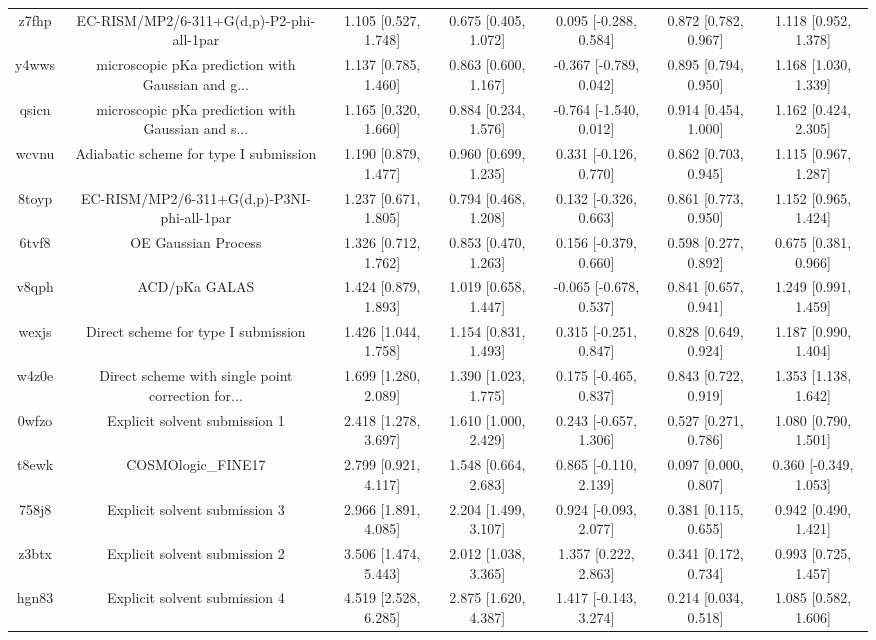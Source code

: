 \documentclass{article}
\begin{document}
\begin{center}
\begin{longtable}{|ccccccc|}
 z7fhp &           EC-RISM/MP2/6-311+G(d,p)-P2-phi-all-1par &  1.105 [0.527, 1.748] &  0.675 [0.405, 1.072] &    0.095 [-0.288, 0.584] &  0.872 [0.782, 0.967] &   1.118 [0.952, 1.378] \\
 y4wws &  microscopic pKa prediction with Gaussian and g... &  1.137 [0.785, 1.460] &  0.863 [0.600, 1.167] &   -0.367 [-0.789, 0.042] &  0.895 [0.794, 0.950] &   1.168 [1.030, 1.339] \\
 qsicn &  microscopic pKa prediction with Gaussian and s... &  1.165 [0.320, 1.660] &  0.884 [0.234, 1.576] &   -0.764 [-1.540, 0.012] &  0.914 [0.454, 1.000] &   1.162 [0.424, 2.305] \\
 wcvnu &             Adiabatic scheme for type I submission &  1.190 [0.879, 1.477] &  0.960 [0.699, 1.235] &    0.331 [-0.126, 0.770] &  0.862 [0.703, 0.945] &   1.115 [0.967, 1.287] \\
 8toyp &         EC-RISM/MP2/6-311+G(d,p)-P3NI-phi-all-1par &  1.237 [0.671, 1.805] &  0.794 [0.468, 1.208] &    0.132 [-0.326, 0.663] &  0.861 [0.773, 0.950] &   1.152 [0.965, 1.424] \\
 6tvf8 &                                OE Gaussian Process &  1.326 [0.712, 1.762] &  0.853 [0.470, 1.263] &    0.156 [-0.379, 0.660] &  0.598 [0.277, 0.892] &   0.675 [0.381, 0.966] \\
 v8qph &                                      ACD/pKa GALAS &  1.424 [0.879, 1.893] &  1.019 [0.658, 1.447] &   -0.065 [-0.678, 0.537] &  0.841 [0.657, 0.941] &   1.249 [0.991, 1.459] \\
 wexjs &                Direct scheme for type I submission &  1.426 [1.044, 1.758] &  1.154 [0.831, 1.493] &    0.315 [-0.251, 0.847] &  0.828 [0.649, 0.924] &   1.187 [0.990, 1.404] \\
 w4z0e &  Direct scheme with single point correction for... &  1.699 [1.280, 2.089] &  1.390 [1.023, 1.775] &    0.175 [-0.465, 0.837] &  0.843 [0.722, 0.919] &   1.353 [1.138, 1.642] \\
 0wfzo &                      Explicit solvent submission 1 &  2.418 [1.278, 3.697] &  1.610 [1.000, 2.429] &    0.243 [-0.657, 1.306] &  0.527 [0.271, 0.786] &   1.080 [0.790, 1.501] \\
 t8ewk &                                 COSMOlogic\_FINE17 &  2.799 [0.921, 4.117] &  1.548 [0.664, 2.683] &    0.865 [-0.110, 2.139] &  0.097 [0.000, 0.807] &  0.360 [-0.349, 1.053] \\
 758j8 &                      Explicit solvent submission 3 &  2.966 [1.891, 4.085] &  2.204 [1.499, 3.107] &    0.924 [-0.093, 2.077] &  0.381 [0.115, 0.655] &   0.942 [0.490, 1.421] \\
 z3btx &                      Explicit solvent submission 2 &  3.506 [1.474, 5.443] &  2.012 [1.038, 3.365] &     1.357 [0.222, 2.863] &  0.341 [0.172, 0.734] &   0.993 [0.725, 1.457] \\
 hgn83 &                      Explicit solvent submission 4 &  4.519 [2.528, 6.285] &  2.875 [1.620, 4.387] &    1.417 [-0.143, 3.274] &  0.214 [0.034, 0.518] &   1.085 [0.582, 1.606] \\
\end{longtable}
\end{center}
\end{document}
